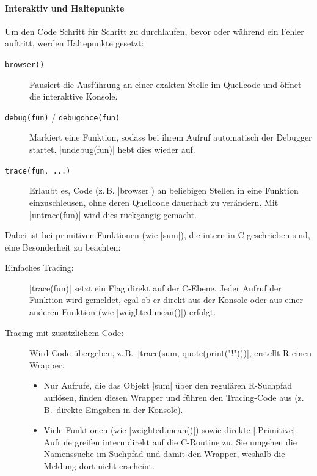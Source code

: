 \documentclass[10pt,twocolumn]{scrartcl}
\renewcommand{\lstinline}{\mycoloredinline}
\begin{document}
\paragraph{Interaktiv und Haltepunkte}

Um den Code Schritt für Schritt zu durchlaufen, bevor oder während ein Fehler auftritt, werden Haltepunkte gesetzt:

\begin{description}
\item[\texttt{browser()}] Pausiert die Ausführung an einer exakten Stelle im Quellcode und öffnet die interaktive Konsole.
\item[\texttt{debug(fun)} / \texttt{debugonce(fun)}] Markiert eine Funktion, sodass bei ihrem Aufruf automatisch der Debugger startet. \lstinline|undebug(fun)| hebt dies wieder auf.
\item[\texttt{trace(fun, ...)}] Erlaubt es, Code (z.\,B. \lstinline|browser|) an beliebigen Stellen in eine Funktion einzuschleusen, ohne deren Quellcode dauerhaft zu verändern. Mit \lstinline|untrace(fun)| wird dies rückgängig gemacht.
\end{description}

Dabei ist bei primitiven Funktionen (wie \lstinline|sum|), die intern in C geschrieben sind, eine Besonderheit zu beachten:

\begin{description}
\item[Einfaches Tracing:] \lstinline|trace(fun)| setzt ein Flag direkt auf der C-Ebene. Jeder Aufruf der Funktion wird gemeldet, egal ob er direkt aus der Konsole oder aus einer anderen Funktion (wie \lstinline|weighted.mean()|) erfolgt.
\item[Tracing mit zusätzlichem Code:] Wird Code übergeben, z.\,B.\ \lstinline|trace(sum, quote(print("!")))|, erstellt R einen Wrapper.
  \begin{itemize}
  \item Nur Aufrufe, die das Objekt \lstinline|sum| über den regulären R-Suchpfad auflösen, finden diesen Wrapper und führen den Tracing-Code aus (z.\,B.\ direkte Eingaben in der Konsole).
  \item Viele Funktionen (wie \lstinline|weighted.mean()|) sowie direkte \lstinline|.Primitive|-Aufrufe greifen intern direkt auf die C-Routine zu. Sie umgehen die Namenssuche im Suchpfad und damit den Wrapper, weshalb die Meldung dort nicht erscheint.
  \end{itemize}
\end{description}
\end{document}
